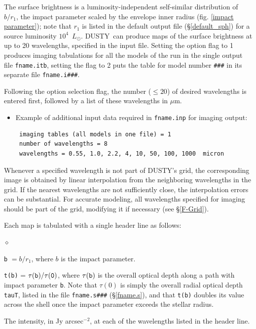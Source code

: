 \documentclass[11pt]{article}
\def\D  {{\sf DUSTY}}
\def\E#1{\hbox{$10^{#1}$}}
\def\mic    {\hbox{$\mu$m}}
\def\Lo     {\hbox{$L_{\odot}$}}
\begin{document}
The surface brightness is a luminosity-independent self-similar distribution
\cite{IE96a} of $b/r_1$, the impact parameter scaled by the envelope inner
radius (fig. \ref{impact parameter}); note that $r_1$ is listed in the default
output file (\S\ref{default_sph}) for a source luminosity \E4~\Lo. \D\ can
produce maps of the surface brightness at up to 20 wavelengths, specified in
the input file. Setting the option flag to 1 produces imaging tabulations for
all the models of the run in the single output file {\tt fname.itb}, setting
the flag to 2 puts the table for model number {\tt \#\#\#} in its separate file
{\tt fname.i\#\#\#}.

Following the option selection flag, the number ($\le 20$) of desired
wavelengths is entered first, followed by a list of these wavelengths in \mic.

\begin{itemize}
\item Example of additional input data required in {\tt fname.inp} for
    imaging output:
\begin{verbatim}
 imaging tables (all models in one file) = 1
 number of wavelengths = 8
 wavelengths = 0.55, 1.0, 2.2, 4, 10, 50, 100, 1000  micron
\end{verbatim}
\end{itemize}
Whenever a specified wavelength is not part of \D's grid, the corresponding
image is obtained by linear interpolation from the neighboring wavelengths in
the grid.  If the nearest wavelengths are not sufficiently close, the
interpolation errors can be substantial. For accurate modeling, all wavelengths
specified for imaging should be part of the grid, modifying it if necessary
(see \S\ref{F-Grid}).

Each map is tabulated with a single header line as follows:
\begin{list}{$\diamond$}{}
\item{\tt b} $= b/r_1$, where $b$ is the impact parameter.
\item {\tt t(b)} = $\tau(\tt b)/\tau(0)$, where $\tau(\tt b)$ is the overall
    optical depth along a path with impact parameter {\tt b}.  Note that
    $\tau(0)$ is simply the overall radial optical depth {\tt tauT}, listed in
    the file {\tt fname.s\#\#\#} (\S \ref{fname.s}), and that {\tt t(b)}
    doubles its value across the shell once the impact parameter exceeds the
    stellar radius.
\item The intensity, in Jy arcsec$^{-2}$, at each of the wavelengths listed in
    the header line.
\end{list}
\end{document}
